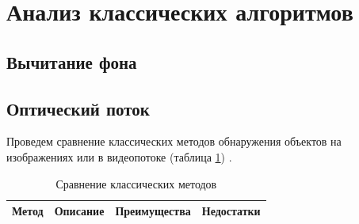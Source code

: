 \section{Анализ классических алгоритмов}
\subsection{Вычитание фона}

\subsection{Оптический поток}

Проведем сравнение классических методов обнаружения объектов на изображениях или в видеопотоке (таблица \ref{tab:classical-methods}) \cite{Brutzer2011EvaluationOB, fleet}.
\begin{longtable}{|l|l|l|l|}
\caption{Сравнение классических методов}
\label{tab:classical-methods}\\
\hline
\multicolumn{1}{|c|}{Метод}                                & \multicolumn{1}{c|}{Описание}                                                                                                                                        & \multicolumn{1}{c|}{Преимущества}                                                                                                                                  & \multicolumn{1}{c|}{Недостатки}                                                                                                                                                              \\ \hline
\endhead
%

\end{longtable}
